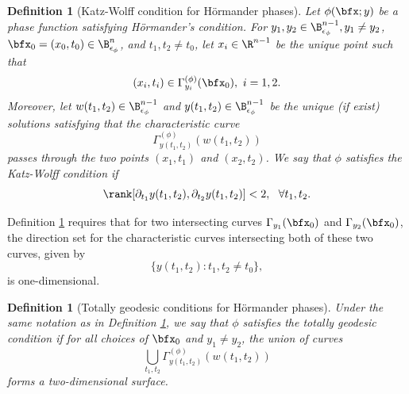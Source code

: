\documentclass{article}
\numberwithin{equation}{section}
\theoremstyle{plain}
\newtheorem{definition}[theorem]{Definition}
\begin{document}
\begin{definition}[Katz-Wolff condition for H\"ormander phases]\label{250510defi1_3}
Let $\phi(\bfx; y)$ be a phase function satisfying H\"ormander's condition. 
For $y_1, y_2\in \B^{n-1}_{\epsilon_{\phi}}, y_1\neq y_2$, $\bfx_0=(x_0, t_0)\in \B^{n}_{\epsilon_{\phi}}$, and $t_1, t_2\neq t_0$, let $x_i\in \R^{n-1}$ be the unique point such that 
\begin{equation}
(x_i, t_i)\in \Gamma^{(\phi)}_{y_i}(\bfx_0), \ i=1, 2.
\end{equation}
Moreover, let $w(t_1, t_2)\in \B^{n-1}_{\epsilon_{\phi}}$ and $y(t_1, t_2)\in \B^{n-1}_{\epsilon_{\phi}}$ be the unique (if exist) solutions  satisfying that the characteristic curve 
\begin{equation}
\Gamma^{(\phi)}_{y(t_1, t_2)}(w(t_1, t_2))
\end{equation}
 passes through the two points $(x_1, t_1)$ and $(x_2, t_2)$.  We say that $\phi$ satisfies the Katz-Wolff condition if
 \begin{equation}
        \rank[\partial_{t_1} y(t_1, t_2), \partial_{t_2} y(t_1, t_2)]< 2, \ \ \forall t_1, t_2.
    \end{equation} 
\end{definition}







Definition \ref{250510defi1_3} requires that for two intersecting curves $\Gamma_{y_1}(\bfx_0)$ and $\Gamma_{y_2}(\bfx_0)$, the direction set for the characteristic curves intersecting both of these two curves, given by 
\begin{equation}
\{y(t_1, t_2): t_1, t_2\neq t_0\},
\end{equation}
is one-dimensional. 






\begin{definition}[Totally geodesic conditions for H\"ormander phases]\label{250510defi1_4}
Under the same notation as in Definition \ref{250510defi1_3}, we say that $\phi$ satisfies the totally geodesic condition if for all choices of $\bfx_0$ and $y_1\neq y_2$, the union of curves 
\begin{equation}
\bigcup_{
t_1, t_2
} \Gamma^{(\phi)}_{y(t_1, t_2)}(w(t_1, t_2))
\end{equation}
forms a two-dimensional surface. 
\end{definition}
\end{document}
